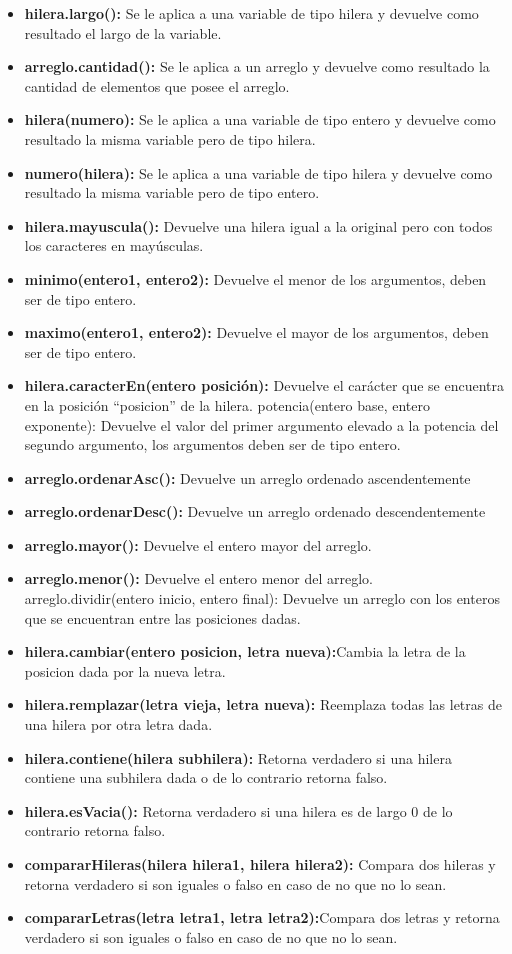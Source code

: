 \documentclass[%
 aip,
 jmp,%
 amsmath,amssymb,
 reprint,%
]{revtex4-1}
\begin{document}
\begin{itemize}
\item\textbf{hilera.largo():} Se le aplica a una variable de tipo hilera y devuelve como resultado el largo de la variable.
\item\textbf{arreglo.cantidad():} Se le aplica a un arreglo y devuelve como resultado la cantidad de elementos que posee el arreglo.
\item\textbf{hilera(numero):} Se le aplica a una variable de tipo entero y devuelve como resultado la misma variable pero de tipo hilera.
\item\textbf{numero(hilera):} Se le aplica a una variable de tipo hilera y devuelve como resultado la misma variable pero de tipo entero.
\item\textbf{hilera.mayuscula():} Devuelve una hilera igual a la original pero con todos los caracteres en mayúsculas.
\item\textbf{minimo(entero1, entero2):} Devuelve el menor de los argumentos, deben ser de tipo entero.
\item\textbf{maximo(entero1, entero2):} Devuelve el mayor de los argumentos, deben ser de tipo entero.
\item\textbf{hilera.caracterEn(entero posición):} Devuelve el carácter que se encuentra en la posición “posicion” de la hilera.
potencia(entero base, entero exponente): Devuelve el valor del primer argumento elevado a la potencia del segundo argumento, los argumentos deben ser de tipo entero.
\item\textbf{arreglo.ordenarAsc():  }Devuelve un arreglo ordenado ascendentemente
\item\textbf{arreglo.ordenarDesc(): } Devuelve un arreglo ordenado descendentemente
\item\textbf{arreglo.mayor():} Devuelve  el entero mayor del arreglo.
\item\textbf{arreglo.menor():} Devuelve el entero menor del arreglo.
arreglo.dividir(entero inicio, entero final): Devuelve un arreglo con los enteros que se encuentran entre las posiciones dadas.
\item\textbf{hilera.cambiar(entero posicion, letra nueva):}Cambia la letra de la posicion dada por la nueva letra.
\item\textbf{hilera.remplazar(letra vieja, letra nueva):} Reemplaza  todas las letras de una hilera por otra letra dada.
\item\textbf{hilera.contiene(hilera subhilera):} Retorna verdadero si una hilera contiene una subhilera dada o de lo contrario retorna falso.
\item\textbf{hilera.esVacia():} Retorna verdadero si una hilera es de largo 0 de lo contrario retorna falso.
\item\textbf{compararHileras(hilera hilera1, hilera hilera2):} Compara dos hileras y retorna verdadero si son iguales o falso en caso de no que no lo sean.
\item\textbf{compararLetras(letra letra1, letra letra2):}Compara dos letras y retorna verdadero si son iguales o falso en caso de no que no lo sean.
\end{itemize}
\end{document}
